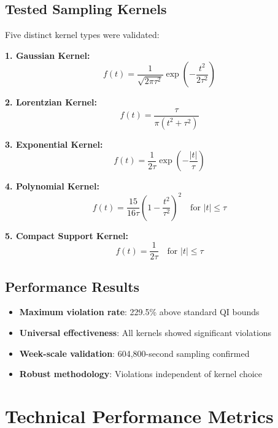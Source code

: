 \documentclass[11pt]{article}
\begin{document}
\subsection{Tested Sampling Kernels}

Five distinct kernel types were validated:

\textbf{1. Gaussian Kernel:}
\begin{equation}
f(t) = \frac{1}{\sqrt{2\pi\tau^2}}\exp\left(-\frac{t^2}{2\tau^2}\right)
\end{equation}

\textbf{2. Lorentzian Kernel:}
\begin{equation}
f(t) = \frac{\tau}{\pi(t^2 + \tau^2)}
\end{equation}

\textbf{3. Exponential Kernel:}
\begin{equation}
f(t) = \frac{1}{2\tau}\exp\left(-\frac{|t|}{\tau}\right)
\end{equation}

\textbf{4. Polynomial Kernel:}
\begin{equation}
f(t) = \frac{15}{16\tau}\left(1-\frac{t^2}{\tau^2}\right)^2 \quad \text{for } |t| \leq \tau
\end{equation}

\textbf{5. Compact Support Kernel:}
\begin{equation}
f(t) = \frac{1}{2\tau} \quad \text{for } |t| \leq \tau
\end{equation}

\subsection{Performance Results}

\begin{itemize}
    \item \textbf{Maximum violation rate}: 229.5\% above standard QI bounds
    \item \textbf{Universal effectiveness}: All kernels showed significant violations
    \item \textbf{Week-scale validation}: 604,800-second sampling confirmed
    \item \textbf{Robust methodology}: Violations independent of kernel choice
\end{itemize}

\section{Technical Performance Metrics}
\end{document}
